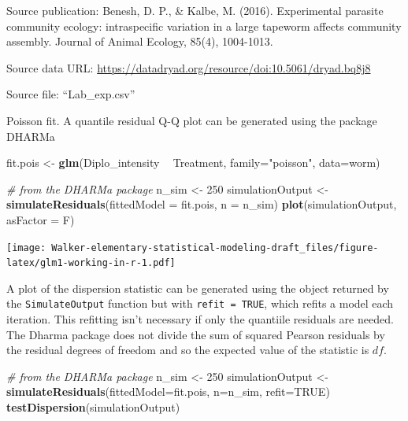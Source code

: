 \documentclass[]{book}
\newenvironment{Shaded}{\begin{snugshade}}{\end{snugshade}}
\newcommand{\CommentTok}[1]{\textcolor[rgb]{0.56,0.35,0.01}{\textit{#1}}}
\newcommand{\DataTypeTok}[1]{\textcolor[rgb]{0.13,0.29,0.53}{#1}}
\newcommand{\DecValTok}[1]{\textcolor[rgb]{0.00,0.00,0.81}{#1}}
\newcommand{\KeywordTok}[1]{\textcolor[rgb]{0.13,0.29,0.53}{\textbf{#1}}}
\newcommand{\NormalTok}[1]{#1}
\newcommand{\OperatorTok}[1]{\textcolor[rgb]{0.81,0.36,0.00}{\textbf{#1}}}
\newcommand{\OtherTok}[1]{\textcolor[rgb]{0.56,0.35,0.01}{#1}}
\newcommand{\StringTok}[1]{\textcolor[rgb]{0.31,0.60,0.02}{#1}}
\begin{document}
Source publication: Benesh, D. P., \& Kalbe, M. (2016). Experimental parasite community ecology: intraspecific variation in a large tapeworm affects community assembly. Journal of Animal Ecology, 85(4), 1004-1013.

Source data URL: \url{https://datadryad.org/resource/doi:10.5061/dryad.bq8j8}

Source file: ``Lab\_exp.csv''

Poisson fit. A quantile residual Q-Q plot can be generated using the package DHARMa

\begin{Shaded}
\begin{Highlighting}[]
\NormalTok{fit.pois <-}\StringTok{ }\KeywordTok{glm}\NormalTok{(Diplo_intensity }\OperatorTok{~}\StringTok{ }\NormalTok{Treatment, }\DataTypeTok{family=}\StringTok{"poisson"}\NormalTok{, }\DataTypeTok{data=}\NormalTok{worm)}

\CommentTok{# from the DHARMa package}
\NormalTok{  n_sim <-}\StringTok{ }\DecValTok{250}
\NormalTok{  simulationOutput <-}\StringTok{ }\KeywordTok{simulateResiduals}\NormalTok{(}\DataTypeTok{fittedModel =}\NormalTok{ fit.pois, }\DataTypeTok{n =}\NormalTok{ n_sim)}
  \KeywordTok{plot}\NormalTok{(simulationOutput, }\DataTypeTok{asFactor =}\NormalTok{ F)}
\end{Highlighting}
\end{Shaded}

\texttt{[image: Walker-elementary-statistical-modeling-draft\_files/figure-latex/glm1-working-in-r-1.pdf]}

A plot of the dispersion statistic can be generated using the object returned by the \texttt{SimulateOutput} function but with \texttt{refit\ =\ TRUE}, which refits a model each iteration. This refitting isn't necessary if only the quantiile residuals are needed. The Dharma package does not divide the sum of squared Pearson residuals by the residual degrees of freedom and so the expected value of the statistic is \(df\).

\begin{Shaded}
\begin{Highlighting}[]
\CommentTok{# from the DHARMa package}
\NormalTok{  n_sim <-}\StringTok{ }\DecValTok{250}
\NormalTok{  simulationOutput <-}\StringTok{ }\KeywordTok{simulateResiduals}\NormalTok{(}\DataTypeTok{fittedModel=}\NormalTok{fit.pois, }\DataTypeTok{n=}\NormalTok{n_sim, }\DataTypeTok{refit=}\OtherTok{TRUE}\NormalTok{)}
  \KeywordTok{testDispersion}\NormalTok{(simulationOutput)}
\end{Highlighting}
\end{Shaded}
\end{document}
